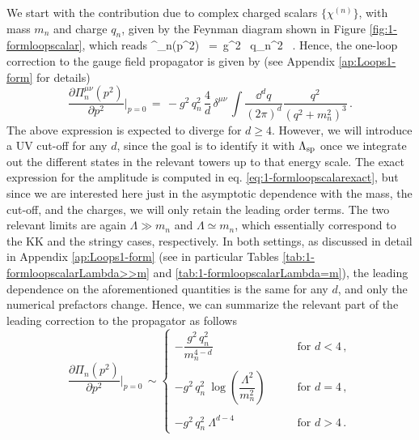 We start with the contribution due to complex charged scalars $\{\chi^{(n)}\}$, with mass $m_n$ and charge $q_n$, given by the Feynman diagram shown in Figure \ref{fig:1-formloopscalar}, which reads
%
\beq
	\Pi^{\mu \nu}_n(p^2) \, =\,   g^2 \, q_n^2 \int {}  \, .
	\label{eq:A1scalar(ap)}
\eeq
%
Hence, the one-loop correction to the gauge field propagator is given by (see Appendix \ref{ap:Loops1-form} for details)
%
\begin{equation}
		\frac{\partial \Pi^{\mu \nu}_n(p^2)}{\partial p^2} \bigg\rvert_{p=0} \, = \, -g^2\,  q_n^2\,   \frac{4}{d} \, \delta^{\mu\nu} \, \int \dfrac{\dd^d q}{(2\pi)^d} \dfrac{q^2}{(q^2+m_n^2)^3} \, .
\end{equation}
%
The above expression is expected to diverge for $d\geq 4$. However, we will introduce a UV cut-off for any $d$, since the goal is to identify it with $\Lambda_{\text{sp}}$ once we integrate out the different states in the relevant towers up to that energy scale. The exact expression for the amplitude is computed in eq. \eqref{eq:1-formloopscalarexact}, but since we are interested here just in the asymptotic dependence with the mass, the cut-off, and the charges, we will only retain the leading order terms. The two relevant limits are again $\Lambda \gg m_n$ and $\Lambda \simeq m_n$, which essentially correspond to the KK and the stringy cases, respectively. In both settings, as discussed in detail in Appendix \ref{ap:Loops1-form} (see in particular Tables \ref{tab:1-formloopscalarLambda>>m} and \ref{tab:1-formloopscalarLambda=m}), the leading dependence on the aforementioned quantities is the same for any $d$, and only the numerical prefactors change. Hence, we can summarize the relevant part of the leading correction to the propagator as follows
%
\begin{equation}\label{eq:1-formloopscalarssummary}
		\frac {\partial \Pi_n(p^2)}{\partial p^2} \bigg\rvert_{p=0}\,   \sim 
		\left\{\begin{array}{lr}
			-  \dfrac{g^2\,  q_n^2}{m_n^{4-d}} & \qquad\text{for } d< 4\, ,\\ \\ 
			-g^2\,  q_n^2 \ \log \left( \dfrac{\Lambda^2}{m_n^2}\right) &\qquad \text{for } d= 4\, ,\\ \\ 
			-g^2\,  q_n^2\ \Lambda^{d-4}&\qquad \text{for } d>4\, .
		\end{array}\right.
\end{equation}
%
	
